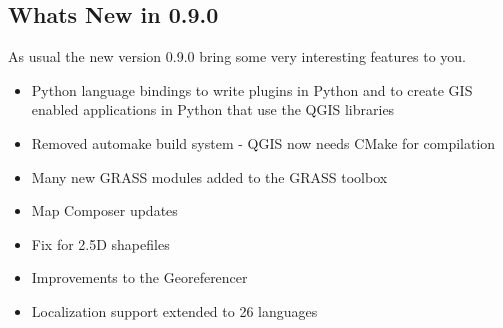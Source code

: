 \subsection{Whats New in 0.9.0}\label{label_whatsnew}

As usual the new version 0.9.0 bring some very interesting features to you.

\begin{itemize}
\item Python language bindings to write plugins in Python and to create GIS 
enabled applications in Python that use the QGIS libraries
\item Removed automake build system - QGIS now needs CMake for compilation
\item Many new GRASS modules added to the GRASS toolbox
\item Map Composer updates
\item Fix for 2.5D shapefiles
\item Improvements to the Georeferencer
\item Localization support extended to 26 languages    
\end{itemize}

